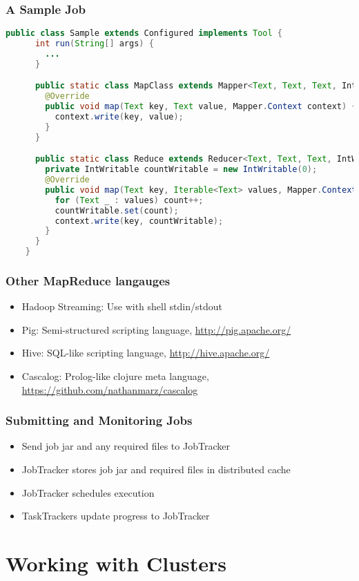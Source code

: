 \documentclass{beamer}
\begin{document}
\begin{frame}[fragile]
  \frametitle{A Sample Job}
  \begin{lstlisting}[language=java,basicstyle=\tiny\sffamily]
    public class Sample extends Configured implements Tool {
      int run(String[] args) {
        ...
      }

      public static class MapClass extends Mapper<Text, Text, Text, Int> {
        @Override
        public void map(Text key, Text value, Mapper.Context context) {
          context.write(key, value);
        }
      }

      public static class Reduce extends Reducer<Text, Text, Text, IntWritable> {
        private IntWritable countWritable = new IntWritable(0);
        @Override
        public void map(Text key, Iterable<Text> values, Mapper.Context context) {
          for (Text _ : values) count++;
          countWritable.set(count);
          context.write(key, countWritable);
        }
      }
    }
  \end{lstlisting}
\end{frame}

\frame
{
  \frametitle{Other MapReduce langauges}
  \begin{itemize}
    \item Hadoop Streaming: Use with shell stdin/stdout
    \item Pig: Semi-structured scripting language, \url{http://pig.apache.org/}
    \item Hive: SQL-like scripting language, \url{http://hive.apache.org/}
    \item Cascalog: Prolog-like clojure meta language, \url{https://github.com/nathanmarz/cascalog}
  \end{itemize}
}

\frame
{
  \frametitle{Submitting and Monitoring Jobs}
  \begin{itemize}
    \item Send job jar and any required files to JobTracker
    \item JobTracker stores job jar and required files in distributed cache
    \item JobTracker schedules execution
    \item TaskTrackers update progress to JobTracker
  \end{itemize}
}

\section{Working with Clusters}
\end{document}

